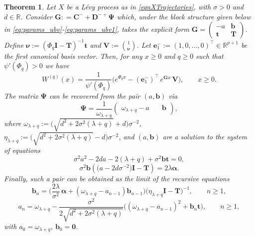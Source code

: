 \documentclass[10pt,a4paper]{amsart}
\newtheorem{theorem}{Theorem}
\begin{document}
\begin{theorem}\label{teoScaleFnUV}
Let $X$ be a L\'evy process as in \eqref{eqnXTrajectories}, with $\sigma>0$ and $d\in \mathbb{R}$. 
Consider $\bm{G}: = \bm{C}^- + \bm{D}^{-+}\bm{\Psi}$ which, under the block structure given below in \eqref{eq:params_ubv}-\eqref{eq:params_ubv1}, takes the explicit form $\bm{G} = \begin{pmatrix} -a & \bm{b} \\ \bm{t} & \bm{T} \end{pmatrix}$. Define $\bm{\nu}:=(\Phi_q \bm{I}-\bm{T})^{-1}\bm{t}$ and $\bm{V}:=\binom{1}{\bm{\nu}}$. Let $\bm{e}_1^-:=(1,0,\dots,0)^\intercal\in\mathbb{R}^{p+1}$ be the first canonical basis vector.
Then, for any $x\geq 0$ and $q\geq 0$ such that $\psi'(\Phi_q)>0$ we have
\begin{equation}\label{eq:scale_ubv}
W^{(q)}(x) = \frac{1}{\psi'(\Phi_q)}\Big(e^{\Phi_q x} - (\bm{e}_1^-)^\intercal\,e^{\bm{G}x}\,\bm{V}\Big), \qquad x \ge 0.
\end{equation}
The matrix $\bm{\Psi}$ can be 
recovered from the pair $(a,\bm{b})$ via
\begin{equation}\label{eq:Psi_from_ab}
\bm{\Psi} = \frac{1}{\omega_{\lambda+q}}\begin{pmatrix}\omega_{\lambda+q} - a & \quad \bm{b}\end{pmatrix},
\end{equation}
where $\omega_{\lambda+q} := \big(\sqrt{d^2 + 2\sigma^2 (\lambda+q)} + d\big)\sigma^{-2}$, $\eta_{\lambda+q} := \big(\sqrt{d^2 + 2\sigma^2 (\lambda+q)} - d\big)\sigma^{-2}$, and $(a,\bm b)$ are a solution to the system of equations
\begin{equation}\label{eq:ivanovs_scalar}
\sigma^2a^2-2da-2(\lambda+q)+\sigma^2\bm b\bm t=0,
\end{equation}
\begin{equation}\label{eq:ivanovs_vector}
\sigma^2\bm{b}\left(\big(a-2d\sigma^{-2}\big)\bm I-\bm{T}\right) =2\lambda\bm{\alpha}.
\end{equation}
Finally, such a pair can be obtained as the limit of the recursive equations
\begin{equation}\label{eq:b_recursion}
\bm{b}_n = \Big( \frac{2\lambda}{\sigma^2}\,\bm{\alpha} + (\omega_{\lambda+q}-a_{n-1})\bm{b}_{n-1} \Big) \big(\eta_{\lambda+q}\bm{I} - \bm{T}\big)^{-1}, \qquad n \ge 1,
\end{equation}
\begin{equation}\label{eq:a_recursion}
a_n = \omega_{\lambda+q} - \frac{\sigma^2}{2\sqrt{d^2+2\sigma^2(\lambda+q)}}\Big((\omega_{\lambda+q} - a_{n-1})^2 + \bm{b}_n\bm{t}\Big), \qquad n \ge 1,
\end{equation}
with $a_0=\omega_{\lambda+q}$, $\bm{b}_0=\bm{0}$.
\end{theorem}
\end{document}

